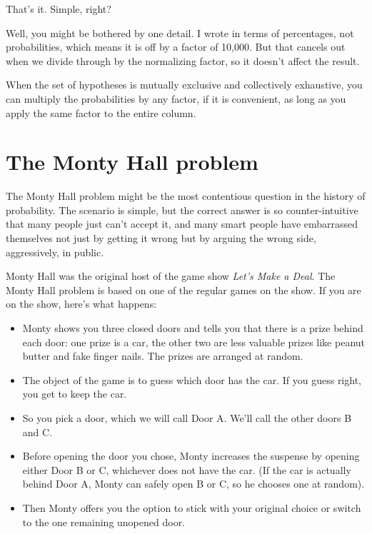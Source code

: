 \documentclass[12pt]{book}
\begin{document}
That's it.  Simple, right?

Well, you might be bothered by one detail.  I wrote 
in terms of percentages, not probabilities, which means it
is off by a factor of 10,000.  But that
cancels out when we divide through by the normalizing factor, so
it doesn't affect the result.

When the set of hypotheses is mutually exclusive and collectively
exhaustive, you can multiply the probabilities by any factor,
if it is convenient, as long as you apply the same factor to the entire
column.


\section{The Monty Hall problem}

The Monty Hall problem might be the most contentious question in
the history of probability.  The scenario is simple, but the correct
answer is so counter-intuitive that many people just can't accept
it, and many smart people have embarrassed themselves not just by
getting it wrong but by arguing the wrong side, aggressively,
in public.

Monty Hall was the original host of the game show {\em Let's Make a
Deal}.  The Monty Hall problem is based on one of the regular
games on the show.  If you are on the show, here's what happens:

\begin{itemize}

\item Monty shows you three closed doors and tells you that there is a
  prize behind each door: one prize is a car, the other two are less
  valuable prizes like peanut butter and fake finger nails.  The
  prizes are arranged at random.

\item The object of the game is to guess which door has the car.  If
  you guess right, you get to keep the car.

\item So you pick a door, which we will call Door A.  We'll call the
  other doors B and C.

\item Before opening the door you chose, Monty increases the
  suspense by opening either Door B or C, whichever does not
  have the car.  (If the car is actually behind Door A, Monty can
  safely open B or C, so he chooses one at random).

\item Then Monty offers you the option to stick with your original
  choice or switch to the one remaining unopened door.

\end{itemize}
\end{document}
